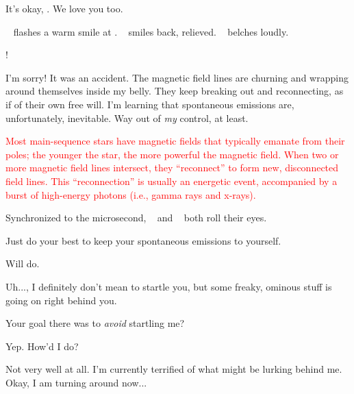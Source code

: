 \documentclass[main.tex]{subfiles}
\begin{document}
\par \Sterope It's okay, \rmmaia.  We love you too.

\par \nar \rmsterope~ flashes a warm smile at \rmmaia.  \rmmaia~ smiles back, relieved.  \rmalcyone~ belches loudly.

\par \Sterope \rmalcyone!

\par \Alcyone I'm sorry!  It was an accident.  The magnetic field lines are churning and wrapping around themselves inside my belly.  They keep breaking out and reconnecting, as if of their own free will.  I'm learning that spontaneous emissions are, unfortunately, inevitable.  Way out of \textit{my} control, at least.

\begin{tcolorbox}[sharp corners, colback=red!30, colframe=red!80!blue, title=Reconnection of Magnetic Field Lines]
\par \textcolor{red} {Most main-sequence stars have magnetic fields that typically emanate from their poles; the younger the star, the more powerful the magnetic field.  When two or more magnetic field lines intersect, they ``reconnect'' to form new, disconnected field lines.  This ``reconnection'' is usually an energetic event, accompanied by a burst of high-energy photons (i.e., gamma rays and x-rays).}   
\end{tcolorbox}

\par \nar Synchronized to the microsecond, \rmmaia~ and \rmsterope~ both roll their eyes.

\par \Maia Just do your best to keep your spontaneous emissions to yourself.

\par \Alcyone Will do. 

\par \Electra Uh...\rmmaia, I definitely don't mean to startle you, but some freaky, ominous stuff is going on right behind you.

\par \Maia Your goal there was to \textit{avoid} startling me?

\par \Electra Yep.  How'd I do?

\par \Maia Not very well at all.  I'm currently terrified of what might be lurking behind me.  Okay, I am turning around now...
\end{document}
